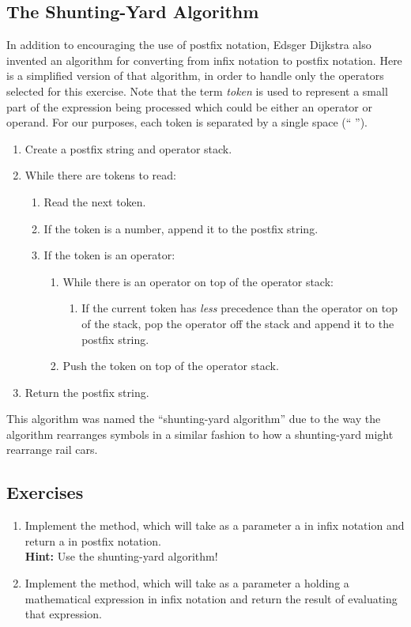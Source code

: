 		\subsection{The Shunting-Yard Algorithm}
			In addition to encouraging the use of postfix notation, Edsger Dijkstra also invented an algorithm for converting from infix notation to postfix notation. Here is a simplified version of that algorithm, in order to handle only the operators selected for this exercise. Note that the term \emph{token} is used to represent a small part of the expression being processed which could be either an operator or operand. For our purposes, each token is separated by a single space (`` '').
			\begin{enumerate}
				\item Create a postfix string and operator stack.
				\item While there are tokens to read:
				\begin{enumerate}
					\item Read the next token.
					\item If the token is a number, append it to the postfix string.
					\item If the token is an operator:
					\begin{enumerate}
						\item While there is an operator on top of the operator stack:
							\begin{enumerate}
								\item If the current token has \emph{less} precedence than the operator on top of the stack, pop the operator off the stack and append it to the postfix string.
							\end{enumerate}
						\item Push the token on top of the operator stack.
					\end{enumerate}
				\end{enumerate}
				\item Return the postfix string.
			\end{enumerate}
			This algorithm was named the ``shunting-yard algorithm'' due to the way the algorithm rearranges symbols in a similar fashion to how a shunting-yard might rearrange rail cars.
		\subsection{Exercises}
			\begin{enumerate}
				\item Implement the  method, which will take as a parameter a  in infix notation and return a  in postfix notation.\\
				{\small\textbf{Hint:} Use the shunting-yard algorithm!}
				\item Implement the  method, which will take as a parameter a  holding a mathematical expression in infix notation and return the result of evaluating that expression.
			\end{enumerate}

